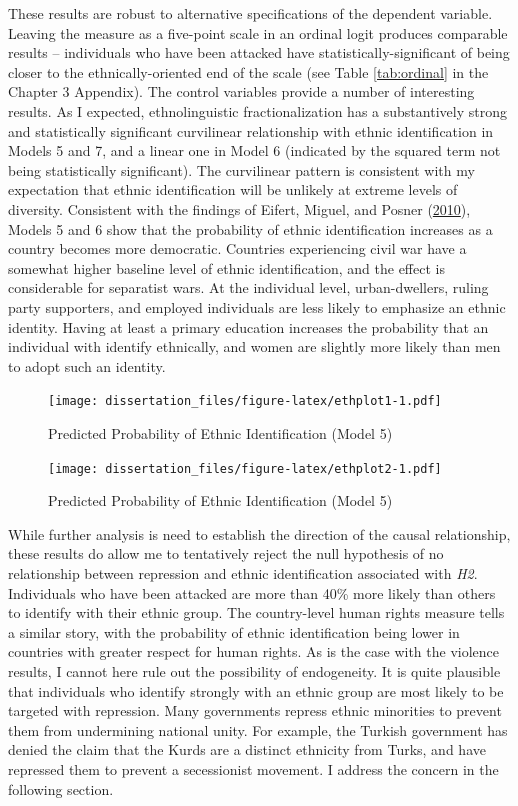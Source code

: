 \documentclass[12pt,]{book}
\theoremstyle{definition}
\theoremstyle{definition}
\theoremstyle{definition}
\theoremstyle{remark}
\begin{document}
These results are robust to alternative specifications of the dependent
variable. Leaving the measure as a five-point scale in an ordinal logit
produces comparable results -- individuals who have been attacked have
statistically-significant of being closer to the ethnically-oriented end
of the scale (see Table \ref{tab:ordinal} in the Chapter 3 Appendix).
The control variables provide a number of interesting results. As I
expected, ethnolinguistic fractionalization has a substantively strong
and statistically significant curvilinear relationship with ethnic
identification in Models 5 and 7, and a linear one in Model 6 (indicated
by the squared term not being statistically significant). The
curvilinear pattern is consistent with my expectation that ethnic
identification will be unlikely at extreme levels of diversity.
Consistent with the findings of Eifert, Miguel, and Posner
(\protect\hyperlink{ref-Eifert2010}{2010}), Models 5 and 6 show that the
probability of ethnic identification increases as a country becomes more
democratic. Countries experiencing civil war have a somewhat higher
baseline level of ethnic identification, and the effect is considerable
for separatist wars. At the individual level, urban-dwellers, ruling
party supporters, and employed individuals are less likely to emphasize
an ethnic identity. Having at least a primary education increases the
probability that an individual with identify ethnically, and women are
slightly more likely than men to adopt such an identity.

\begin{figure}
\centering
\texttt{[image: dissertation\_files/figure-latex/ethplot1-1.pdf]}
\caption{\label{fig:ethplot1}Predicted Probability of Ethnic Identification
(Model 5)}
\end{figure}

\begin{figure}
\centering
\texttt{[image: dissertation\_files/figure-latex/ethplot2-1.pdf]}
\caption{\label{fig:ethplot2}Predicted Probability of Ethnic Identification
(Model 5)}
\end{figure}

While further analysis is need to establish the direction of the causal
relationship, these results do allow me to tentatively reject the null
hypothesis of no relationship between repression and ethnic
identification associated with \emph{H2}. Individuals who have been
attacked are more than 40\% more likely than others to identify with
their ethnic group. The country-level human rights measure tells a
similar story, with the probability of ethnic identification being lower
in countries with greater respect for human rights. As is the case with
the violence results, I cannot here rule out the possibility of
endogeneity. It is quite plausible that individuals who identify
strongly with an ethnic group are most likely to be targeted with
repression. Many governments repress ethnic minorities to prevent them
from undermining national unity. For example, the Turkish government has
denied the claim that the Kurds are a distinct ethnicity from Turks, and
have repressed them to prevent a secessionist movement. I address the
concern in the following section.
\end{document}
